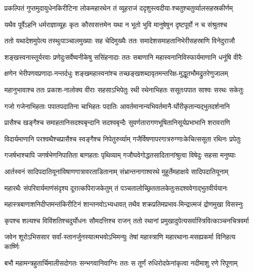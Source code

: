 \twolineshloka
{प्रकल्पितं गुप्तमुदायुधेनकिरीटिना लोकमहारथेन}
{तं व्यूहराजं ददृशुस्त्वदीया-श्चतुश्चतुर्व्यालसहस्रकीर्णम्}


\twolineshloka
{यथैव पूर्वेऽहनि धर्मराज्ञाव्यूहः कृतः कौरवसत्तमेन}
{यथा न भूतो भुवि मानुषेषुन दृष्टपूर्वो न च संश्रुतश्च}


\twolineshloka
{ततो यथादेशमुपेत्य तस्थुःपाञ्चालमुख्याः सह चेदिमुख्यैः}
{ततः समादेशसमाहतानिभेरीसहस्राणि विनेदुराजौ}


\twolineshloka
{शङ्खस्वनास्तूर्यरवाः प्रणेदुःसर्वेष्वनीकेषु ससिंहनादाः}
{ततः सबाणानि महास्वनानिविस्फार्यमाणानि धनूंषि वीरैः}


\twolineshloka
{क्षणेन भेरीपणवप्रणादा-नन्तर्दधुः शङ्खमहास्वनांश्च}
{तच्छङ्खशब्दावृतमन्तरिक्ष-मुद्धूतभौमद्रुतरेणुजालम्}


\twolineshloka
{महानुभावाश्च ततः प्रकाश-नालोक्य वीराः सहसाऽभिपेतुः}
{रथी रथेनाभिहतः ससूतःपपात साश्वः सरथः सकेतुः}


\twolineshloka
{गजो गजेनाभिहताः पपातपदातिना चाभिहतः पदातिः}
{आवर्तमानान्यभिवर्तमानै-र्घोरीकृतान्यद्भुतदर्शनानि}


\twolineshloka
{प्रासैश्च खङ्गैश्च समाहतानिसदश्वबृन्दानि सदश्वबृन्दैः}
{सुवर्णतारागणभूषितानिसूर्यप्रभाभानि शरावराणि}


\twolineshloka
{विदार्यमाणानि परश्वथैश्चप्रासैश्च स्वङ्गैश्च निपेतुरुर्व्याम्}
{गजैर्विषणापरगात्ररुग्णाःकेचित्ससूता रथिनः प्रपेतुः}


\twolineshloka
{गजर्षभाश्चापि जगर्षभेणनिपातिता बाणहताः पृथिव्याम्}
{गजौघवेगोद्धतसादितानांश्रुत्वा विषेदुः सहसा मनुष्याः}


\twolineshloka
{आर्तस्वनं सादिपदातियूनांविषाणगात्रावरताडितानाम्}
{संभ्रान्तनागाश्वरथे मुहूर्तेमहाक्षये सादिपदातियूनाम्}


\twolineshloka
{महारथैः संपरिवार्यमाणंसंदृश्य दूरात्कपिराजकेतुम्}
{तं पञ्चतालोच्छ्रिततालकेतुःसदश्ववेगाद्भुतवीर्ययानः}


\twolineshloka
{महास्त्रबाणाशनिदीप्तमन्तंकिरीटिनं शान्तनवोऽभ्यधावत्}
{तथैव शक्रप्रतिमप्रभाव-मिन्द्रात्मजं द्रोणमुखा विसस्नुः}


\twolineshloka
{कृपश्च शल्यश्च विविंशतिश्चदुर्योधनः सौमदत्तिश्च राजन्}
{ततो रथानां प्रमुखादुपेत्यसर्वास्त्रिवित्काञ्चनचित्रवर्मा}


\twolineshloka
{जवेन शूरोऽभिससार सर्वां-स्तानर्जुनस्यात्मभवोऽभिमन्युः}
{तेषां महास्त्राणि महारथाना-मसह्यकर्मा विनिहत्य कार्ष्णिः}


\twolineshloka
{बभौ महामन्त्रहुतार्चिमालीसदोगतः सन्भगवानिवाग्निः}
{ततः स तूर्णं रुधिरोदफेनांकृत्वा नदीमाशु रणे रिपूणाम्}


